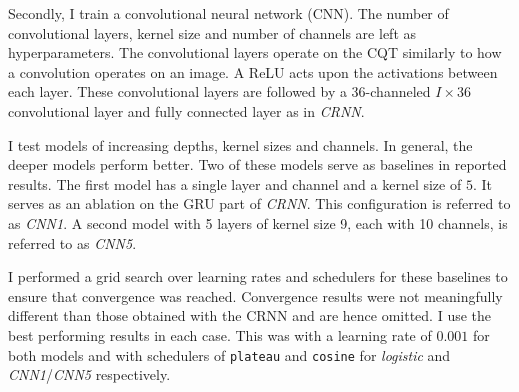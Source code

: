 Secondly, I train a convolutional neural network (CNN). The number of convolutional layers, kernel size and number of channels are left as hyperparameters. The convolutional layers operate on the CQT similarly to how a convolution operates on an image. A ReLU acts upon the activations between each layer. These convolutional layers are followed by a 36-channeled $I\times 36$ convolutional layer and fully connected layer as in \emph{CRNN}. 

I test models of increasing depths, kernel sizes and channels. In general, the deeper models perform better. Two of these models serve as baselines in reported results. The first model has a single layer and channel and a kernel size of $5$. It serves as an ablation on the GRU part of \emph{CRNN}. This configuration is referred to as \emph{CNN1}. A second model with 5 layers of kernel size 9, each with 10 channels, is referred to as \emph{CNN5}.

I performed a grid search over learning rates and schedulers for these baselines to ensure that convergence was reached. Convergence results were not meaningfully different than those obtained with the CRNN and are hence omitted. I use the best performing results in each case. This was with a learning rate of $0.001$ for both models and with schedulers of \texttt{plateau} and \texttt{cosine} for \emph{logistic} and \emph{CNN1}/\emph{CNN5} respectively.



